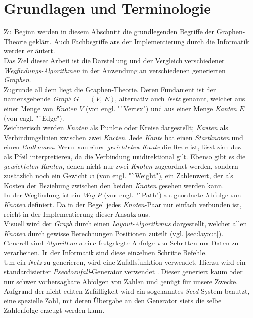 \documentclass[12pt]{article}
\begin{document}
\section{Grundlagen und Terminologie}
\label{sec:basics}
Zu Beginn werden in diesem Abschnitt die grundlegenden Begriffe der Graphen-Theorie geklärt. Auch Fachbegriffe aus der Implementierung durch die Informatik werden erläutert.
\\
Das Ziel dieser Arbeit ist die Darstellung und der Vergleich verschiedener \textit{Wegfindungs-Algorithmen} in der Anwendung an verschiedenen generierten \textit{Graphen}.
\\
Zugrunde all dem liegt die Graphen-Theorie. Deren Fundament ist der namensgebende \textit{Graph} $G\; = (V,\,E)$, alternativ auch \textit{Netz} genannt, welcher aus einer Menge von \textit{Knoten} $V$ 
(von engl. "`Vertex") und aus einer Menge \textit{Kanten} $E$ (von engl. "`Edge").
\\
Zeichnerisch werden \textit{Knoten} als Punkte oder Kreise dargestellt; \textit{Kanten} als Verbindungslinien zwischen zwei \textit{Knoten}. Jede \textit{Kante} hat einen \textit{Startknoten} und
einen \textit{Endknoten}. Wenn von einer \textit{gerichteten Kante} die Rede ist, lässt sich das als Pfeil interpretieren, da die Verbindung unidirektional gilt. Ebenso gibt es die \textit{gewichteten Kanten}, 
denen nicht nur zwei \textit{Knoten} zugeordnet werden, sondern zusätzlich noch ein Gewicht $w$ (von engl. "`Weight"), ein Zahlenwert, der als Kosten der Beziehung zwischen den beiden \textit{Knoten} gesehen werden kann.
\\
In der Wegfindung ist ein \textit{Weg} $P$ (von engl. "`Path") als geordnete Abfolge von \textit{Knoten} definiert. Da in der Regel jedes \textit{Knoten}-Paar nur einfach verbunden ist, reicht in der Implementierung 
dieser Ansatz aus.
\\
Visuell wird der \textit{Graph} durch einen \textit{Layout-Algorithmus} dargestellt, welcher allen \textit{Knoten} durch gewisse Berechnungen Positionen zuteilt (vgl. \autoref{sec:layout}).
\\
Generell sind \textit{Algorithmen} eine festgelegte Abfolge von Schritten um Daten zu verarbeiten. In der Informatik sind diese einzelnen Schritte Befehle.
\\
Um ein \textit{Netz} zu generieren, wird eine Zufallsfunktion verwendet. Hierzu wird ein standardisierter \textit{Pseodozufall}-Generator verwendet \cite{random}. Dieser generiert kaum oder nur schwer vorhersagbare Abfolgen 
von Zahlen und genügt für unsere Zwecke. Aufgrund der nicht echten Zufälligkeit wird ein sogenanntes \textit{Seed}-System benutzt, eine spezielle Zahl, mit deren Übergabe an den Generator stets die selbe Zahlenfolge erzeugt
werden kann.
\newpage
\end{document}
